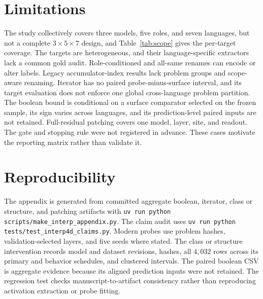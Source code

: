 \documentclass{article}
\begin{document}
\section{Limitations}

The study collectively covers three models, five roles, and seven languages,
but not a complete $3\times5\times7$ design, and Table~\ref{tab:scope} gives
the per-target coverage. The targets are heterogeneous, and their
language-specific extractors lack a common gold audit. Role-conditioned and
all-same renames can encode or alter labels. Legacy accumulator-index results
lack problem groups and scope-aware renaming. Iterator has no paired
probe-minus-surface interval, and its target evaluation does not enforce one
global cross-language problem partition. The boolean bound is conditional on a
surface comparator selected on the frozen sample, its sign varies across
languages, and its prediction-level paired inputs are not retained.
Full-residual patching covers one model, layer, site, and readout. The gate and stopping rule were not
registered in advance. These cases motivate the reporting matrix rather than
validate it.

\clearpage



\appendix
\raggedbottom


\FloatBarrier
{}
\section{Reproducibility}
\label{app:repro}
The appendix is generated from committed aggregate boolean, iterator, class or
structure, and patching artifacts with
\texttt{uv run python scripts/make\_interp\_appendix.py}. The claim audit uses
\texttt{uv run python tests/test\_interp4d\_claims.py}. Modern probes use
problem hashes, validation-selected layers, and five seeds where stated. The
class or structure intervention records model and dataset revisions, hashes,
all $4{,}032$ rows across its primary and behavior schedules, and clustered
intervals. The paired boolean CSV is
aggregate evidence because its aligned prediction inputs were not retained.
The regression test checks manuscript-to-artifact consistency rather than
reproducing activation extraction or probe fitting.


\end{document}

